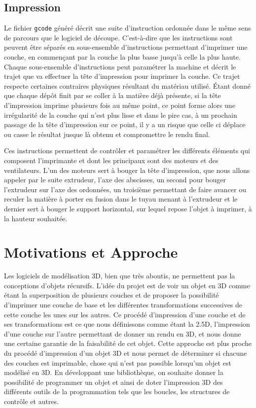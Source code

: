 \documentclass[11pt, titlepage]{article}
\begin{document}
\subsection{Impression}
Le fichier \verb&gcode& généré décrit une suite d'instruction ordonnée dans le même sens de parcours que le logiciel de découpe. C'est-à-dire que les instructions sont peuvent être séparés en sous-ensemble d'instructions permettant d'imprimer une couche, en commençant par la couche la plus basse jusqu'à celle la plus haute. Chaque sous-ensemble d'instructions peut paramétrer la machine et décrit le trajet que va effectuer la tête d'impression pour imprimer la couche. Ce trajet respecte certaines contraires physiques résultant du matériau utilisé. Étant donné que chaque dépôt finit par se coller à la matière déjà présente, si la tête d'impression imprime plusieurs fois au même point, ce point forme alors une irrégularité de la couche qui n'est plus lisse et dans le pire cas, à un prochain passage de la tête d'impression sur ce point, il y a un risque que celle ci déplace ou casse le résultat jusque là obtenu et compromettre le rendu final.

Ces instructions permettent de contrôler et paramétrer les différents éléments qui composent l'imprimante et dont les principaux sont des moteurs et des ventilateurs. L'un des moteurs sert à bouger la tête d'impression, que nous allons appeler par le suite extrudeur, l'axe des abscisses, un second pour bouger l'extrudeur sur l'axe des ordonnées, un troisième permettant de faire avancer ou reculer la matière à porter en fusion dans le tuyau menant à l'extrudeur et le dernier sert à bouger le support horizontal, sur lequel repose l'objet à imprimer, à la hauteur souhaitée.

\newpage
\section{Motivations et Approche}
Les logiciels de modélisation 3D, bien que très aboutis, ne permettent pas la conceptions d’objets récursifs.
L'idée du projet est de voir un objet en 3D comme étant la superposition de plusieurs couches et de proposer la possibilité d'imprimer une couche de base et les différentes transformations successives de cette couche les unes sur les autres. Ce procédé d'impression d'une couche et de ses transformations est ce que nous définissons comme étant la 2.5D, l'impression d'une couche sur l'autre permettant de donner un rendu en 3D, et nous donne une certaine garantie de la faisabilité de cet objet. Cette approche est plus proche du procédé d'impression d'un objet 3D et nous permet de déterminer si chacune des couches est imprimable, chose qui n'est pas possible lorsqu'un objet est modélisé en 3D.
En développant une bibliothèque, on souhaite donner la possibilité de programmer un objet et ainsi de doter l'impression 3D des différents outils de la programmation tels que les boucles, les structures de contrôle et autres.
\end{document}
